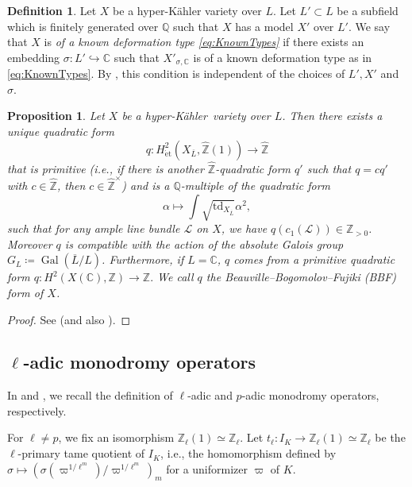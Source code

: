 \documentclass[12pt,reqno]{amsart}
\newtheorem{prop}[thm]{Proposition}
\theoremstyle{definition}
\newtheorem{defn}[thm]{Definition}
\newcommand{\Q}{{\mathds Q}}
\newcommand{\Z}{{\mathds Z}}
\newcommand{\C}{{\mathds C}}
\newcommand\Gal{\mathop{\mathrm{Gal}}\nolimits}
\newcommand{\et}{\mathrm{\acute{e}t}}
\newcommand{\hk}{hyper-Kähler~}
\numberwithin{equation}{section}
\begin{document}
\begin{defn}\label{Definition:known type hyper kahler}
    Let $X$ be a hyper-Kähler variety over $L$.
    Let $L' \subset L$ be a subfield which is finitely generated over $\Q$ such that $X$ has a model $X'$ over $L'$.
    We say that $X$ is \textit{of a known deformation type \eqref{eq:KnownTypes}} if there exists an embedding $\sigma \colon L' \hookrightarrow \C$ such that 
    $X'_{\sigma,\C}$ is of a known deformation type as in \eqref{eq:KnownTypes}.
    By , this condition is independent of the choices of $L', X'$ and  $\sigma$.
\end{defn}


\begin{prop}
    Let $X$ be a \hk variety over $L$.
    Then there exists a unique quadratic form
    \[
    q \colon H^2_{\et} (X_{\overline{L}}, \widehat{\Z} (1)) \rightarrow \widehat{\Z}
    \]
    that is \emph{primitive} (i.e., if there is another $\widehat{\Z}$-quadratic form $q'$ such that $q = c q'$ with $c \in \widehat{\Z}$, then $c \in \widehat{\Z}^{\times}$) and is a $\Q$-multiple of the quadratic form
    \[
    \alpha \mapsto \int \sqrt{\mathrm{td}_{X_{\overline{L}}}} \alpha^2,
    \]
    such that for any ample line bundle $\mathscr{L}$ on $X$, we have $q (c_1(\mathscr{L})) \in \Z_{>0}$.
    Moreover $q$ is compatible with the action of the absolute Galois group
    $G_L\coloneqq \Gal (\overline{L}/L)$.
    Furthermore, if $L=\C$, $q$ comes from a primitive quadratic form 
    $q \colon {H^2 (X(\C),\Z)} \rightarrow \Z.
    $
    We call $q$ the  \emph{Beauville--Bogomolov--Fujiki (BBF) form} of $X$.
\end{prop}
\begin{proof}
See \cite[Lemma 4.2.1]{Bindt} (and also \cite[Theorem 4.2.4]{Bindt}).
\end{proof}




\subsection{$\ell$-adic monodromy operators}
\label{Subsection:ell adic monodromy operators}

In  and , we recall the definition of $\ell$-adic and $p$-adic monodromy operators, respectively.

For $\ell \neq p$, we fix an isomorphism $\Z_\ell(1) \simeq \Z_\ell$.
Let
$t_{\ell} \colon I_K \rightarrow \Z_{\ell} (1) \simeq \Z_\ell$
be the $\ell$-primary tame quotient of $I_K$, i.e.,  the homomorphism defined by $\sigma \mapsto (\sigma (\varpi^{1/\ell^m})/\varpi^{1/\ell^m})_m$
for a uniformizer $\varpi$ of $K$.
\end{document}
